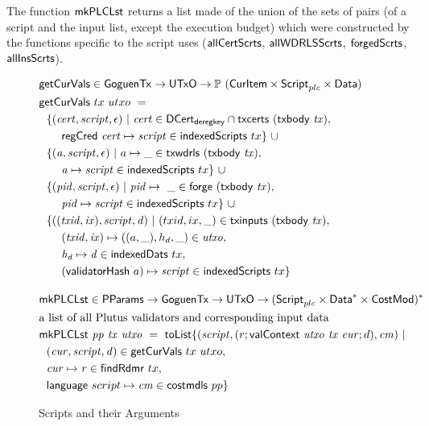 The function $\mathsf{mkPLCLst}$ returns a list made of the union of the sets of
pairs (of a script and the input list, except the execution budget) which were constructed by the
functions specific to the script uses ($\mathsf{allCertScrts}$, $\mathsf{allWDRLSScrts}$,
$\mathsf{forgedScrts}$, $\mathsf{allInsScrts}$).


\begin{figure}[htb]
  \begin{align*}
    & \fun{getCurVals} \in \GoguenTx \to \UTxO \to \powerset{(\CurItem \times \ScriptPlutus \times \Data)} \\
    & \fun{getCurVals}~{tx}~{utxo}~=~ \\
    & ~~\{ (\var{cert}, \var{script}, \epsilon) ~|~ \var{cert} \in \DCertDeRegKey\cap\fun{txcerts}~(\txbody{tx}), \\
    & ~~~~~~\fun{regCred}~\var{cert}\mapsto \var{script}\in \fun{indexedScripts}~{tx} \}~\cup \\
    & ~~\{ (\var{a}, \var{script}, \epsilon) ~|~ a \mapsto \_ \in\fun{txwdrls}~(\txbody{tx}), \\
    & ~~~~~~\var{a}\mapsto \var{script}\in \fun{indexedScripts}~{tx}\}~\cup \\
    & ~~\{ (\var{pid}, \var{script}, \epsilon) ~|~ \var{pid}\mapsto ~ \_ \in \fun{forge}~(\txbody{tx}), \\
    & ~~~~~~\var{pid}\mapsto \var{script}\in \fun{indexedScripts}~{tx}\}~\cup \\
    & ~~\{ ((\var{txid}, \var{ix}), \var{script}, \var{d}) ~|~ (txid,ix, \_) \in \fun{txinputs}~(\txbody{tx}), \\
    & ~~~~~~(\var{txid}, \var{ix}) \mapsto ((a,\_),h_d, \_) \in \var{utxo}, \\
    & ~~~~~~\var{h_d}\mapsto \var{d} \in \fun{indexedDats}~{tx}, \\
    & ~~~~~~(\fun{validatorHash}~{a})\mapsto \var{script}\in \fun{indexedScripts}~{tx} \}
    \nextdef
    & \fun{mkPLCLst} \in \PParams \to \GoguenTx \to \UTxO \to \seqof{(\ScriptPlutus \times \seqof{\Data} \times \CostMod)} \\
    & \text{a list of all Plutus validators and corresponding input data} \\
    & \fun{mkPLCLst} ~\var{pp}~\var{tx}~ \var{utxo} ~=~
      \fun{toList} \{ (\var{script}, (r; \fun{valContext}~\var{utxo}~\var{tx}~\var{cur}; d), \var{cm}) ~|~ \\
    & ~~(\var{cur}, \var{script}, \var{d}) \in \fun{getCurVals}~{tx}~{utxo}, \\
    & ~~\var{cur} \mapsto \var{r} \in \fun{findRdmr}~{tx}, \\
    & ~~\fun{language}~{script} \mapsto \var{cm} \in \fun{costmdls}~{pp} \}
  \end{align*}
  \caption{Scripts and their Arguments}
  \label{fig:functions:script2}
\end{figure}

